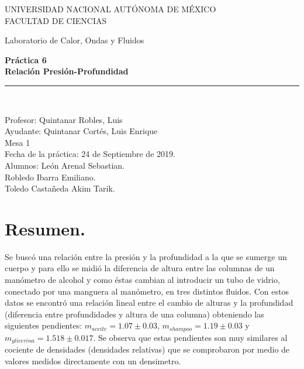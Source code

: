 \documentclass[a4paper]{article}
\begin{document}
\begin{titlepage}
\begin{center}
\begin{figure}
\end{figure}
\vspace*{0.5in}
UNIVERSIDAD NACIONAL AUTÓNOMA DE MÉXICO\\
\vspace*{0.2in}
FACULTAD DE CIENCIAS \\
\vspace*{0.5in}
\begin{large}
Laboratorio de Calor, Ondas y Fluidos\\
\end{large}
\vspace*{0.2in}
\begin{Large}
\textbf{Práctica 6} \\
\textbf{Relación Presión-Profundidad} \\
\end{Large}
\vspace*{0.3in}
\vspace*{0.3in}
\rule{80mm}{0.1mm}\\
\vspace*{0.1in}
\begin{large}
Profesor:  Quintanar Robles, Luis  \\
Ayudante: Quintanar Cortés, Luis Enrique \\
Mesa 1\\
Fecha de la práctica: 24 de Septiembre de 2019.\\
Alumnos: León Arenal Sebastian.\\
Robledo Ibarra Emiliano. \\
Toledo Castañeda Akim Tarik.\\

\end{large}
\end{center}
\end{titlepage}



\section*{Resumen.}
Se buscó una relación entre la presión y la profundidad a la que se sumerge un cuerpo y para ello se midió la diferencia de altura entre las columnas de un manómetro de alcohol y como éstas cambian al introducir un tubo de vidrio, conectado por una manguera al manómetro, en tres distintos fluidos. Con estos datos se encontró una relación lineal entre el cambio de alturas  y la profundidad (diferencia entre profundidades y altura de una columna)  obteniendo las siguientes pendientes: $m_{aceite}=1.07\pm0.03$, $m_{shampoo}=1.19\pm0.03$ y $m_{glicerina}=1.518\pm0.017$. Se observa que estas pendientes son muy similares al cociente de densidades (densidades relativas) que se comprobaron por medio de valores medidos directamente con un densimetro.
\end{document}
